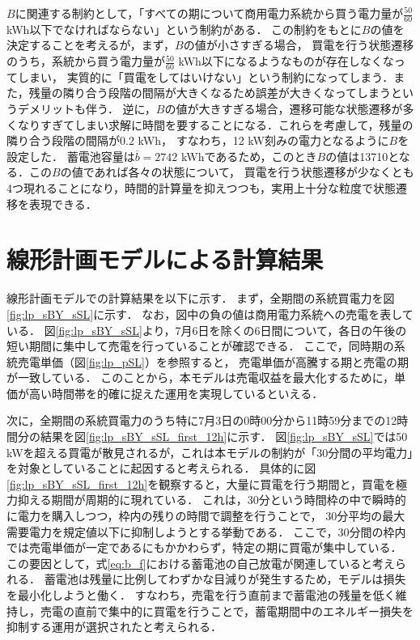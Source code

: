 $B$に関連する制約として，「すべての期について商用電力系統から買う電力量が$\frac{50}{60}$ kWh以下でなければならない」という制約がある．
この制約をもとに$B$の値を決定することを考えるが，まず，$B$の値が小さすぎる場合，
 買電を行う状態遷移のうち，系統から買う電力量が$\frac{50}{60}$ kWh以下になるようなものが存在しなくなってしまい，
 実質的に「買電をしてはいけない」という制約になってしまう．また，残量の隣り合う段階の間隔が大きくなるため誤差が大きくなってしまうというデメリットも伴う．
 逆に，$B$の値が大きすぎる場合，遷移可能な状態遷移が多くなりすぎてしまい求解に時間を要することになる．これらを考慮して，残量の隣り合う段階の間隔が$0.2$ kWh，
 すなわち，12 kW刻みの電力となるように$B$を設定した．
蓄電池容量は$\overline{b}=2742$ kWhであるため，このとき$B$の値は13710となる．この$B$の値であれば各々の状態について，
買電を行う状態遷移が少なくとも4つ現れることになり，時間的計算量を抑えつつも，実用上十分な粒度で状態遷移を表現できる．

\section{線形計画モデルによる計算結果}
線形計画モデルでの計算結果を以下に示す．
まず，全期間の系統買電力を図\ref{fig:lp_sBY_sSL}に示す．
なお，図中の負の値は商用電力系統への売電を表している．
図\ref{fig:lp_sBY_sSL}より，7月6日を除くの6日間について，各日の午後の短い期間に集中して売電を行っていることが確認できる．
ここで，同時期の系統売電単価（図\ref{fig:lp_pSL}）を参照すると，
売電単価が高騰する期と売電の期が一致している．
このことから，本モデルは売電収益を最大化するために，単価が高い時間帯を的確に捉えた運用を実現しているといえる．

次に，全期間の系統買電力のうち特に7月3日の0時00分から11時59分までの12時間分の結果を図\ref{fig:lp_sBY_sSL_first_12h}に示す．
図\ref{fig:lp_sBY_sSL}では50 kWを超える買電が散見されるが，これは本モデルの制約が「30分間の平均電力」を対象としていることに起因すると考えられる．
具体的に図\ref{fig:lp_sBY_sSL_first_12h}を観察すると，大量に買電を行う期間と，買電を極力抑える期間が周期的に現れている．
これは，30分という時間枠の中で瞬時的に電力を購入しつつ，枠内の残りの時間で調整を行うことで，
30分平均の最大需要電力を規定値以下に抑制しようとする挙動である．
ここで，30分間の枠内では売電単価が一定であるにもかかわらず，特定の期に買電が集中している．
この要因として，式\eqref{eq:b_f}における蓄電池の自己放電が関連していると考えられる．
蓄電池は残量に比例してわずかな目減りが発生するため，モデルは損失を最小化しようと働く．
すなわち，売電を行う直前まで蓄電池の残量を低く維持し，売電の直前で集中的に買電を行うことで，蓄電期間中のエネルギー損失を抑制する運用が選択されたと考えられる．

